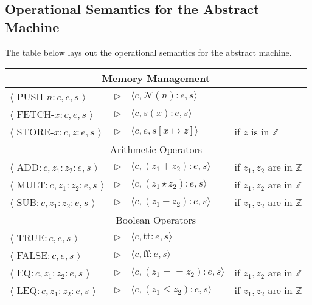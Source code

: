 \newpage

\subsection{Operational Semantics for the Abstract Machine}

The table below lays out the operational semantics for the abstract machine.
\begin{center}
  \renewcommand{\arraystretch}{1.6}
  \begin{tabular}{ l c l l }
    \hline \multicolumn{4}{c}{Memory Management} \\ \hline
    $\langle$ PUSH-$n:c, e, s$             $\rangle$ & $\triangleright$ & $\langle c, \mathcal{N}(n):e, s \rangle$ & \\
    $\langle$ FETCH-$x:c, e, s$            $\rangle$ & $\triangleright$ & $\langle c, s(x):e, s \rangle$ & \\
    $\langle$ STORE-$x:c, z:e, s$          $\rangle$ & $\triangleright$ & $\langle c, e, s[x \mapsto z] \rangle$ & if $z$ is in $\mathbb{Z}$ \\
    \hline \multicolumn{4}{c}{Arithmetic Operators} \\ \hline
    $\langle$ ADD$:c, z_1:z_2:e, s$        $\rangle$ & $\triangleright$ & $\langle c, (z_1 + z_2):e, s \rangle$ & if $z_1, z_2$ are in $\mathbb{Z}$ \\
    $\langle$ MULT$:c, z_1:z_2:e, s$       $\rangle$ & $\triangleright$ & $\langle c, (z_1 \star z_2):e, s \rangle$ & if $z_1, z_2$ are in $\mathbb{Z}$ \\
    $\langle$ SUB$:c, z_1:z_2:e, s$        $\rangle$ & $\triangleright$ & $\langle c, (z_1 - z_2):e, s \rangle$ & if $z_1, z_2$ are in $\mathbb{Z}$ \\
    \hline \multicolumn{4}{c}{Boolean Operators} \\ \hline
    $\langle$ TRUE$:c, e, s$               $\rangle$ & $\triangleright$ & $\langle c, \text{tt}:e, s \rangle$ & \\
    $\langle$ FALSE$:c, e, s$              $\rangle$ & $\triangleright$ & $\langle c, \text{ff}:e, s \rangle$ & \\
    $\langle$ EQ$:c, z_1:z_2:e, s$         $\rangle$ & $\triangleright$ & $\langle c, (z_1 == z_2):e, s \rangle$ & if $z_1, z_2$ are in $\mathbb{Z}$ \\
    $\langle$ LEQ$:c, z_1:z_2:e, s$        $\rangle$ & $\triangleright$ & $\langle c, (z_1 \leq z_2):e, s \rangle$ & if $z_1, z_2$ are in $\mathbb{Z}$ \\
   

\end{tabular}
\end{center}

